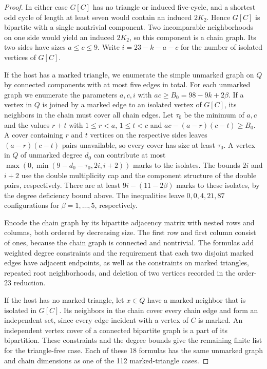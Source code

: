 \begin{proof}
In either case $G[C]$ has no triangle or induced five-cycle, and
a shortest odd cycle of length at least seven would contain an
induced $2K_2$. Hence $G[C]$ is bipartite with a single nontrivial component.
Two incomparable neighborhoods on one side would yield an
induced $2K_2$, so this component is a chain graph. Its two
sides have sizes $a\le c\le9$. Write $i=23-k-a-c$ for the
number of isolated vertices of $G[C]$.

If the host has a marked triangle, we enumerate the simple
unmarked graph on $Q$ by connected components with at most
five edges in total. For each unmarked graph we enumerate
the parameters $a,c,i$ with $ac\ge B_0=98-9k+2\beta$.
If a vertex in $Q$ is joined by a marked edge to an isolated vertex
of $G[C]$, its neighbors in the chain must cover all chain edges.
Let $\tau_0$
be the minimum of $a,c$ and the values $r+t$ with
$1\le r<a$, $1\le t<c$ and $ac-(a-r)(c-t)\ge B_0$.
A cover containing $r$ and $t$ vertices on the respective
sides leaves $(a-r)(c-t)$ pairs unavailable, so every cover
has size at least $\tau_0$. A vertex in $Q$ of unmarked
degree $d_0$ can contribute at most
$\max(0,\min(9-d_0-\tau_0,2i,i+2))$ marks to the isolates.
The bounds $2i$ and $i+2$ use the double multiplicity cap
and the component structure of the double pairs,
respectively. There are at least $9i-(11-2\beta)$ marks
to these isolates, by the degree deficiency bound above.
The inequalities leave $0,0,4,21,87$ configurations for
$\beta=1,\ldots,5$, respectively.

Encode the chain graph by its bipartite adjacency matrix
with nested rows and columns, both ordered by decreasing
size. The first row and first column consist of ones,
because the chain graph is connected and nontrivial.
The formulas add weighted degree constraints and the
requirement that each two disjoint marked edges have adjacent endpoints, as well as
the constraints on marked triangles, repeated root
neighborhoods, and deletion of two vertices recorded in
the order-23 reduction.

If the host has no marked triangle, let $x\in Q$ have a marked neighbor
that is isolated in $G[C]$. Its neighbors in the chain cover every
chain edge and form an independent set, since every edge incident
with a vertex of $C$ is marked. An
independent vertex cover of a connected bipartite graph
is a part of its bipartition. These constraints and the
degree bounds give the remaining finite list for the triangle-free
case. Each of these 18 formulas has the same unmarked graph and
chain dimensions as one of the 112 marked-triangle cases.


\end{proof}
